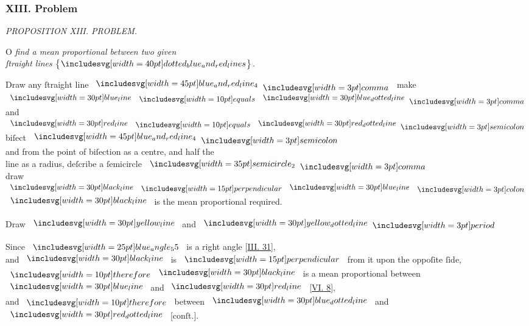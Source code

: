 \documentclass[12pt,preview]{standalone}
\begin{document}
\subsubsection{XIII. Problem}

\begin{minipage}[t]{0.64\textwidth}
    \vspace{0pt}

    \begin{center}
        \textit{PROPOSITION XIII. PROBLEM.}\label{book6pr13} \\
    \end{center}

    \hfill

    \begin{center}
        \raggedright \lettrine[lines=4, loversize=1, nindent=0pt]{}{}O \textit{find a mean proportional between two given\\ ſtraight lines} $\left\{\hspace{-1ex}\img[0][0][40]{dotted_blue_and_red_lines}\hspace{-1ex}\right\}$.
    \end{center}

    \hfill

    \hfill

    \hfill

    \begin{center}
        Draw any ſtraight line $\bimg{blue_and_red_line_4} \bcomma$ make $\blueline \bequals \dottedblueline \bcomma$\\
        and $\redline \bequals \dottedredline \bsemicolon$ biſect $\bimg{blue_and_red_line_4} \bsemicolon$\\
        and from the point of biſection as a centre, and half the\\
        line as a radius, deſcribe a ſemicircle $\img[0][0][35]{semicircle_2} \bcomma$\\
        draw $\blackline \bperp \blueline \bcolon$\\
        $\blackline$ is the mean proportional required.
    \end{center}

    \hfill

    \begin{center}
        Draw $\yellowline$ and $\dottedyellowline \bperiod$
    \end{center}

    \hfill

    \begin{center}
        Since $\img{blue_angle_55}$ is a right angle [\hyperref[book3pr31]{\textsc{III.} 31}],\\
        and $\blackline$ is $\bperp$ from it upon the oppoſite ſide,\\
        $\btherefore \blackline$ is a mean proportional between\\
        $\blueline$ and $\redline$ [\hyperref[book6pr8]{\textsc{VI.} 8}],\\
        and $\btherefore$ between $\dottedblueline$ and $\dottedredline$ [conſt.].
    \end{center}


\end{minipage}
\end{document}
